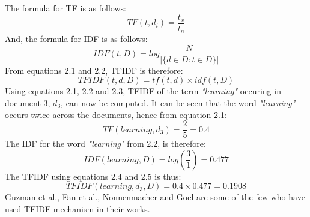 \documentclass[a4paper,12pt,twoside]{report}
\begin{document}
\newline \newline
The formula for TF is as follows:
\newline
\begin{equation}
\label{eq:tfidf1}
    TF(t, d_i) = \frac{t_x}{t_n}
\end{equation}
\newline
And, the formula for IDF is as follows:
\newline
\begin{equation}
\label{eq:tfidf2}
    IDF(t, D) = log\frac{N}{|\{d \in D : t \in D\}|}
\end{equation}
\newline
From equations 2.1 and 2.2, TFIDF is therefore:
\newline
\begin{equation}
\label{eq:tfidf3}
    TFIDF(t, d, D) = tf(t, d)\times idf(t, D)
\end{equation}
\newline
Using equations 2.1, 2.2 and 2.3, TFIDF of the term  \textit{"learning"} occuring in document 3, $d_3$, can now be computed. It can be seen that the word \textit{"learning"} occurs twice across the documents, hence from equation 2.1:
\newline
\begin{equation}
\label{eq:tfidf4}
    TF(learning, d_3) = \frac{2}{5} = 0.4
\end{equation}
\newline
The IDF for the word \textit{"learning"} from 2.2, is therefore:
\newline
\begin{equation}
\label{eq:tfidf5}
    IDF(learning, D) = log(\frac{3}{1}) = 0.477
\end{equation}
\newline
The TFIDF using equations 2.4 and 2.5 is thus:
\newline
\begin{equation}
\label{eq:tfidf6}
    TFIDF(learning, d_3, D) = 0.4\times0.477 = 0.1908
\end{equation}
\newline 
Guzman et al.\cite{Guzman2017}, Fan et al.\cite{Fan2017}, Nonnenmacher\cite{Nonnenmacher2017} and Goel \cite{Goel2017} are some of the few who have used TFIDF mechanism in their works.
  
\end{document}
